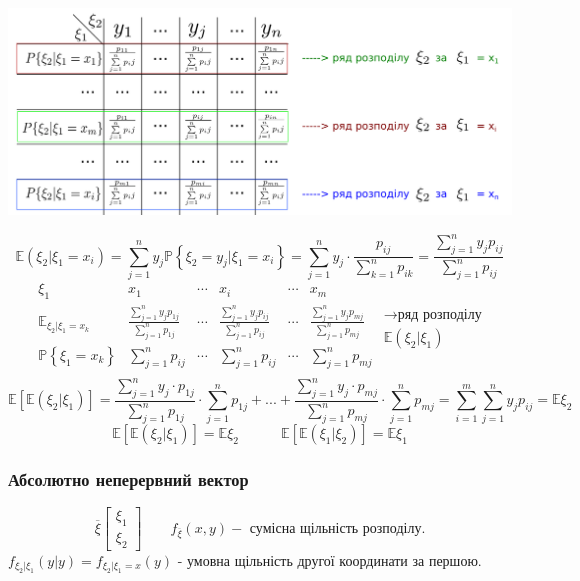 \begin{center}
\includegraphics[scale=0.28]{images/20.png} \end{center}
$$
\mathbb{E}(\xi_2 | \xi_1 = x_i)  =  \sum\limits_{j = 1}^{ n}{ y_j \mathbb{P} \left\lbrace \xi_2 = y_j | \xi_1 = x_i \right\rbrace } =  \sum\limits_{j = 1}^{n}{ y_{j} \cdot \frac{p_{ij} }{  \sum\limits_{k = 1}^{ n}{p_{ik}}}}= \frac{  \sum\limits_{j = 1}^{ n}{ y_j p_{ij}}}{  \sum\limits_{j = 1}^{n}{ p_{ij}}}
$$
$$
\begin{matrix}
	\xi_1 & x_1 & \cdots  &x_i & \cdots & x_m \\
	\mathbb{E}_{\xi_2 | \xi_1=x_k}  &  \frac{  \sum\limits_{j = 1}^{ n}{ y_j p_{1j}}}{  \sum\limits_{j = 1}^{n}{ p_{1j}}}  & \cdots  &\frac{  \sum\limits_{j = 1}^{ n}{ y_j p_{ij}}}{  \sum\limits_{j = 1}^{n}{ p_{ij}}}  & \cdots & \frac{  \sum\limits_{j = 1}^{ n}{ y_j p_{mj}}}{  \sum\limits_{j = 1}^{n}{ p_{mj}}}  \\
	\mathbb{P} \left\lbrace \xi_1 = x_k \right\rbrace &   \sum\limits_{j = 1}^{n}{ p_{ij}} & \cdots  &\sum\limits_{j = 1}^{n}{ p_{ij}} & \cdots & \sum\limits_{j = 1}^{n}{ p_{mj}} \\
\end{matrix}
\begin{gathered}
\longrightarrow \text{ряд розподілу}\\
\mathbb{E}(\xi_2| \xi_1)
\end{gathered}
$$
$$
\mathbb{E}[ \mathbb{E} (\xi_2 | \xi_1)] =
\frac{  \sum\limits_{j = 1}^{n}  {y_j \cdot p_{1j}} }   {  \sum\limits_{j = 1}^{ n}{ p_{1j}}} \cdot  \sum\limits_{j = 1}^{ n}{ p_{1j}}+ ... +
\frac{  \sum\limits_{j = 1}^{n}{y_j \cdot p_{mj}} }   {  \sum\limits_{j = 1}^{ n}{ p_{mj}}} \cdot  \sum\limits_{j = 1}^{ n}{ p_{mj}} =  \sum\limits_{i = 1}^{m}{  \sum\limits_{j =1 }^{ n}{ y_j p_{ij}}} = \mathbb{E}\xi_2
$$
$$
\mathbb{E}[ \mathbb{E} (\xi_2 | \xi_1)] = \mathbb{E}  \xi_2  \quad \quad \quad \mathbb{E}[ \mathbb{E} (\xi_1 | \xi_2)] = \mathbb{E}  \xi_1
$$
\subsubsection{Абсолютно неперервний вектор}
$$
\overline{\xi}  \begin{bmatrix}
 \xi_1 \\ \xi_2
\end{bmatrix} \qquad f_{\overline{\xi}} (x,y) - \text{ сумісна щільність розподілу.}
$$
$
f_{\xi_2 | \xi_1} (y|y) = f_{\xi_2| \xi_1 = x} (y)
$ - умовна щільність другої координати за першою.\\

